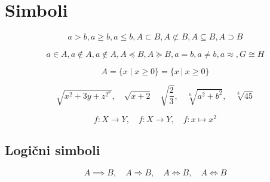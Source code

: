 \documentclass[11pt,a4paper]{article}
\theoremstyle{plain}
\theoremstyle{definition}
\theoremstyle{plain}
\theoremstyle{definition}
\begin{document}
%
%
%
%
%

\section{Simboli}
$$
a > b, a \geq b, a \leq b, A \subset B, A \not \subset B, A \subseteq B, A \supset B
$$

$$
a \in A, a \not \in A, a \notin A, A \preceq B, A \succeq B, a = b, a \neq b, a \approx , G \cong H
$$


$$
A = \{ x \mid x \geq 0 \} = \{ x \ | \ x \geq 0  \}
$$

$$
\sqrt{x^2+3y+z^{2^n}}, \quad \sqrt{x+2} \quad \sqrt{\frac23}, \quad \sqrt[n]{a^2+b^2}, \quad \sqrt[3]{45}
$$

$$
f: X \to Y,\quad f \colon X \to Y, \quad f\colon x \mapsto x^2
$$
\subsection{Logični simboli}\label{subsec:log}
$$
A \implies B, \quad A \Longrightarrow B,\quad A \iff B,\quad A \Longleftrightarrow B
$$
\end{document}
